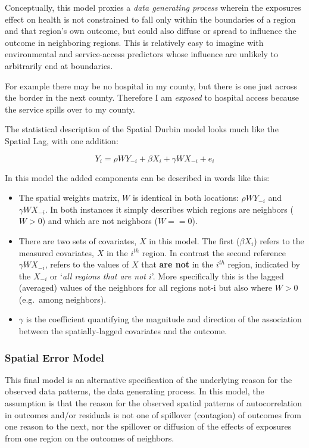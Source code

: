 \documentclass[
]{book}
\providecommand{\tightlist}{%
  \setlength{\itemsep}{0pt}\setlength{\parskip}{0pt}}
\begin{document}
Conceptually, this model proxies a \emph{data generating process} wherein the exposures effect on health is not constrained to fall only within the boundaries of a region and that region's own outcome, but could also diffuse or spread to influence the outcome in neighboring regions. This is relatively easy to imagine with environmental and service-access predictors whose influence are unlikely to arbitrarily end at boundaries.

For example there may be no hospital in my county, but there is one just across the border in the next county. Therefore I am \emph{exposed} to hospital access because the service spills over to my county.

The statistical description of the Spatial Durbin model looks much like the Spatial Lag, with one addition:

\[Y_i=\rho WY_{-i} + \beta X_i + \gamma WX_{-i} + e_i\]

In this model the added components can be described in words like this:

\begin{itemize}
\tightlist
\item
  The spatial weights matrix, \(W\) is identical in both locations: \(\rho WY_{-i}\) and \(\gamma WX_{-i}\). In both instances it simply describes which regions are neighbors (\(W>0\)) and which are not neighbors (\(W==0\)).
\item
  There are two sets of covariates, \(X\) in this model. The first (\(\beta X_i\)) refers to the measured covariates, \(X\) in the \(i^{th}\) region. In contrast the second reference \(\gamma WX_{-i}\), refers to the values of \(X\) that \textbf{are not} in the \(i^{th}\) region, indicated by the \(X_{-i}\) or `\emph{all regions that are not \(i\)}'. More specifically this is the lagged (averaged) values of the neighbors for all regions not-i but also where \(W>0\) (e.g.~among neighbors).
\item
  \(\gamma\) is the coefficient quantifying the magnitude and direction of the association between the spatially-lagged covariates and the outcome.
\end{itemize}

\hypertarget{spatial-error-model}{%
\subsubsection{Spatial Error Model}\label{spatial-error-model}}

This final model is an alternative specification of the underlying reason for the observed data patterns, the data generating process. In this model, the assumption is that the reason for the observed spatial patterns of autocorrelation in outcomes and/or residuals is not one of spillover (contagion) of outcomes from one reason to the next, nor the spillover or diffusion of the effects of exposures from one region on the outcomes of neighbors.
\end{document}
